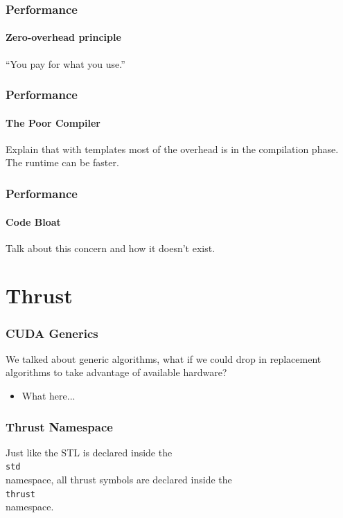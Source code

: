 \documentclass{beamer}
\begin{document}



\begin{frame}
  \frametitle{Performance}
  \framesubtitle{Zero-overhead principle}
  {\Huge ``You pay for what you use.''}
\end{frame}

\begin{frame}
  \frametitle{Performance}
  \framesubtitle{The Poor Compiler}
  Explain that with templates most of the overhead is
  in the compilation phase. The runtime can be faster.
\end{frame}

\begin{frame}
  \frametitle{Performance}
  \framesubtitle{Code Bloat}
  Talk about this concern and how it doesn't exist.
\end{frame}

\section{Thrust}

\begin{frame}
  \frametitle{CUDA Generics}
  We talked about generic algorithms, what if we could drop in
  replacement algorithms to take advantage of available hardware?
  \begin{itemize}
    \item What here...
  \end{itemize}
\end{frame}

\begin{frame}[fragile]
  \frametitle{Thrust Namespace}
  Just like the STL is declared inside the \\
  \vspace{.5cm}\hspace{1cm}\lstinline|std|\vspace{.5cm} \\
  namespace, all thrust symbols are declared inside the \\
  \vspace{.5cm}\hspace{1cm}\lstinline|thrust|\vspace{.5cm} \\
  namespace.
\end{frame}
\end{document}
